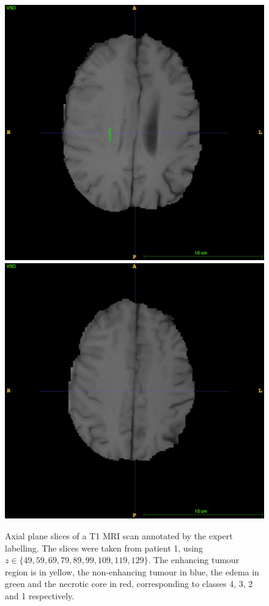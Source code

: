 \documentclass[12pt,a4paper,twoside,openright]{report}
\begin{document}
\begin{figure}
	\includegraphics[scale=0.1]{expert_segmentation_119}
	\includegraphics[scale=0.1]{expert_segmentation_129}
	\caption[Slices of a T1 MRI scan annotated with the expert labelling.]{Axial plane slices of a T1 MRI scan annotated by the expert labelling. The slices were taken from patient 1, using $z \in \{49, 59, 69, 79, 89, 99, 109, 119, 129\}$. The enhancing tumour region is in yellow, the non-enhancing tumour in blue, the edema in green and the necrotic core in red, corresponding to classes 4, 3, 2 and 1 respectively.}
	\label{fig:expert_segmentations}
\end{figure}
\end{document}
